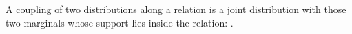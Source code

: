 \begin{definition}
  \label{def:pmfrel}
  \leanok
  A coupling of two distributions along a relation is a joint distribution with those two marginals whose support lies inside the relation: .
\end{definition}

